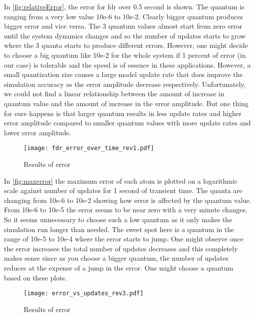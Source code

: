 \documentclass{article}
\theoremstyle{scsthe}
\begin{document}
In \autoref{fig:relativeError}, the error for fdr over 0.5 second is shown. The quantum is ranging from a very low value 10e-6 to 10e-2. Clearly bigger quantum produces bigger error and vice versa. The 3 quantum values almost start from zero error until the system dynamics changes and so the number of updates starts to grow where the 3 quanta starts to produce different errors. However, one might decide to choose a big quantum like 10e-2 for the whole system if 1 percent of error (in our case) is tolerable and the speed is of essence in these applications. However, a small quantization size causes a large model update rate that does improve the simulation accuracy as the error amplitude decrease respectively. Unfortunately, we could not find a linear relationship between the amount of increase in quantum value and the amount of increase in the error amplitude. But one thing for sure happens is that larger quantum results in less update rates and higher error amplitude compared to smaller quantum values with more update rates and lower error amplitude.

\begin{figure}[H]
 \FloatBarrier
    \centering
    \texttt{[image: fdr\_error\_over\_time\_rev1.pdf]}
    \caption{Results of error}
    \label{fig:relativeError}
\end{figure}

In \autoref{fig:maxerror} the maximum error of each atom is plotted on a logarithmic scale against number of updates for 1 second of transient time. The quanta are changing from 10e-6 to 10e-2 showing how error is affected by the quantum value. From 10e-6 to 10e-5 the error seems to be near zero with a very minute changes. So it seems unnecessary to choose such a low quantum as it only makes the simulation run longer than needed. The sweet spot here is a quantum in the range of 10e-5 to 10e-4 where the error starts to jump. One might observe once the error increases the total number of updates decreases and this completely makes sense since as you choose a bigger quantum, the number of updates reduces at the expense of a jump in the error. One might choose a quantum based on these plots. 

\begin{figure}[H]
  \FloatBarrier
    \centering
    \texttt{[image: error\_vs\_updates\_rev3.pdf]}
    \caption{Results of error}
    \label{fig:maxerror}
\end{figure}
\end{document}
